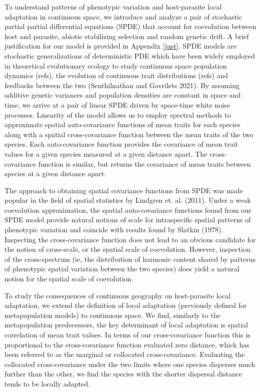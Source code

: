 \documentclass{article}
\begin{document}
To understand patterns of phenotypic variation and host-parasite local
adaptation in continuous space, we introduce and analyze a pair of
stochastic partial partial differential equations (SPDE) that account
for coevolution between host and parasite, abiotic stabilizing selection
and random genetic drift. A brief justification for our model is
provided in Appendix \ref{just}. SPDE models are stochastic
generalizations of deterministic PDE which have been widely employed in
theoretical evolutionary ecology to study continuous space population
dynamics (refs), the evolution of continuous trait distributions (refs)
and feedbacks between the two (Senthilnathan and Gavrilets 2021). By
assuming additive genetic variances and population densities are
constant in space and time, we arrive at a pair of linear SPDE driven by
space-time white noise processes. Linearity of the model allows us to
employ spectral methods to approximate spatial auto-covariance functions
of mean traits for each species along with a spatial cross-covariance
function between the mean traits of the two species. Each
auto-covariance function provides the covariance of mean trait values
for a given species measured at a given distance apart. The
cross-covariance function is similar, but returns the covariance of mean
traits between species at a given distance apart.

The approach to obtaining spatial covariance functions from SPDE was
made popular in the field of spatial statistics by Lindgren et. al.
(2011). Under a weak coevolution approximation, the spatial
auto-covariance functions found from our SPDE model provide natural
notions of scale for intraspecific spatial patterns of phenotypic
variation and coincide with results found by Slatkin (1978). Inspecting
the cross-covariance function does not lead to an obvious candidate for
the notion of cross-scale, or the spatial scale of coevolution. However,
inspection of the cross-spectrum (ie, the distribution of harmonic
content shared by patterns of phenotypic spatial variation between the
two species) does yield a natural notion for the spatial scale of
coevolution.

To study the consequences of continuous geography on host-parasite local
adaptation, we extend the definition of local adaptation (previously
defined for metapopulation models) to continuous space. We find,
similarly to the metapopulation predecessors, the key determinant of
local adaptation is spatial correlation of mean trait values. In terms
of our cross-covariance function this is proportional to the
cross-covariance function evaluated zero distance, which has been
referred to as the marginal or collocated cross-covariance. Evaluating
the collocated cross-covariance under the two limits where one species
disperses much further than the other, we find the species with the
shorter dispersal distance tends to be locally adapted.
\end{document}
